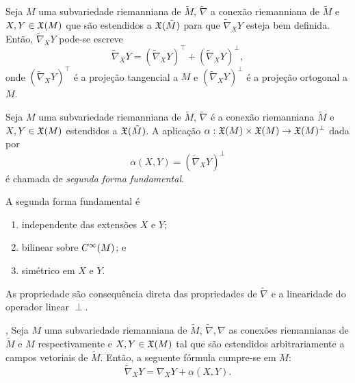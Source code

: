 \begin{observacao}
	Seja $M$ uma subvariedade riemanniana de $\tilde{M}$,
	$\tilde{\nabla}$ a conexão riemanniana de $\tilde{M}$ e 
	$X,Y \in \mathfrak{X}(M)$ que são estendidos a $\mathfrak{X}(\tilde{M})$ para que $\tilde{\nabla}_X Y$ esteja bem definida.
	Então, $\tilde{\nabla}_X Y$ pode-se escreve
	\begin{equation*}
	\tilde{\nabla}_X Y = \left(\tilde{\nabla}_X Y\right)^\top + \left(\tilde{\nabla}_X Y\right)^\perp,
	\end{equation*}
	onde $\left(\tilde{\nabla}_X Y\right)^\top$ é a projeção tangencial a $M$ e $\left(\tilde{\nabla}_X Y\right)^\perp$ é a projeção ortogonal a $M$.
\end{observacao}

\begin{definicao}
	Seja $M$ uma subvariedade riemanniana de $\tilde{M}$,
	$\tilde{\nabla}$ é a conexão riemanniana $\tilde{M}$ e
	$X,Y \in \mathfrak{X}(M)$ estendidos a $\mathfrak{X}(\tilde{M})$.
	A aplicação $\alpha: \mathfrak{X}(M) \times \mathfrak{X}(M) \rightarrow \mathfrak{X}(M)^\perp$ dada por
	\begin{equation*}
		\alpha(X,Y) = (\tilde{\nabla}_X Y)^\perp
	\end{equation*} 
	é chamada de \emph{segunda forma fundamental}.
\end{definicao}

\begin{proposicao}
	A segunda forma fundamental é
	\begin{enumerate}
		\item independente das extensões $X$ e $Y$;
		\item bilinear sobre $C^\infty(M)$; e
		\item simétrico em $X$ e $Y$.
	\end{enumerate}
\end{proposicao}

\begin{demonstracao}
	As propriedade são consequência direta das propriedades de $\tilde{\nabla}$ e a linearidade do operador linear $\perp$. 
\end{demonstracao}

\begin{teorema}\label{formula-de-gauss},
	Seja $M$ uma subvariedade riemanniana de $\tilde{M}$,
	$\tilde{\nabla}, \nabla$ as conexões riemannianas de $\tilde{M}$ e $M$ respectivamente e
	$X,Y \in \mathfrak{X}(M)$ tal que são estendidos arbitrariamente a campos vetoriais de $\tilde{M}$.
	Então, a seguente fórmula cumpre-se em $M$:
	\begin{equation*}
		\tilde{\nabla}_X Y = \nabla_X Y + \alpha(X,Y).
	\end{equation*}
\end{teorema}

